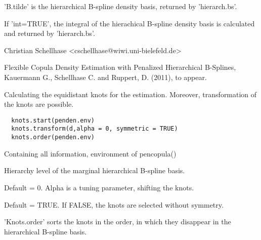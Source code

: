 \documentclass[a4paper]{book}
\begin{document}
%
\begin{Value}
\begin{ldescription}
\item[\code{B.tilde}] 'B.tilde' is the hierarchical B-spline density basis,
returned by 'hierarch.bs'.
\item[\code{int.B.tilde}] If 'int=TRUE', the integral of the hierachical
B-spline density basis is calculated and returned by 'hierarch.bs'.
\end{ldescription}
\end{Value}
%
\begin{Author}\relax
Christian Schellhase <cschellhase@wiwi.uni-bielefeld.de>
\end{Author}
%
\begin{References}\relax
Flexible Copula Density Estimation with Penalized
Hierarchical B-Splines, Kauermann G., Schellhase C. and Ruppert, D. (2011), to appear.
\end{References}
%
\begin{Description}\relax
Calculating the equidistant knots for the estimation. Moreover,
transformation of the knots are possible.
\end{Description}
%
\begin{Usage}
\begin{verbatim}
  knots.start(penden.env)
  knots.transform(d,alpha = 0, symmetric = TRUE)
  knots.order(penden.env)
\end{verbatim}
\end{Usage}
%
\begin{Arguments}
\begin{ldescription}
\item[\code{penden.env}] Containing all information, environment of
pencopula()
\item[\code{d}] Hierarchy level of the marginal hierarchical B-spline basis.
\item[\code{alpha}] Default = 0. Alpha is a tuning parameter, shifting the
knots.
\item[\code{symmetric}] Default = TRUE. If FALSE, the knots are selected
without symmetry.
\end{ldescription}
\end{Arguments}
%
\begin{Details}\relax
'Knots.order' sorts the knots in the order, in which they disappear
in the hierarchical B-spline basis.
\end{Details}
\end{document}
